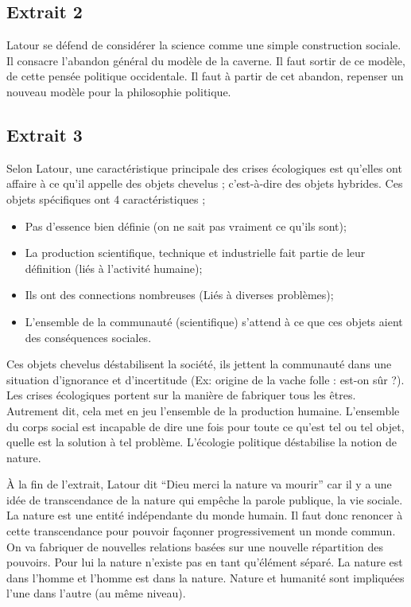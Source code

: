\subsection{Extrait 2}

Latour se défend de considérer la science comme une simple construction sociale.
Il consacre l'abandon général du modèle de la caverne.
Il faut sortir de ce modèle, de cette pensée politique occidentale.
Il faut à partir de cet abandon, repenser un nouveau modèle pour la philosophie politique.

\subsection{Extrait 3}

Selon Latour, une caractéristique principale des crises écologiques est qu'elles ont affaire à ce qu'il appelle des objets chevelus ; c'est-à-dire des objets hybrides.
Ces objets spécifiques ont 4 caractéristiques ;
\begin{itemize}
	\item Pas d'essence bien définie (on ne sait pas vraiment ce qu'ils sont);
	\item La production scientifique, technique et industrielle fait partie de leur définition (liés à l'activité humaine);
	\item Ils ont des connections nombreuses (Liés à diverses problèmes);
	\item L'ensemble de la communauté (scientifique) s'attend à ce que ces objets aient des conséquences sociales.
\end{itemize}
Ces objets chevelus déstabilisent la société, ils jettent la communauté dans une situation d'ignorance et d'incertitude (Ex: origine de la vache folle : est-on sûr ?).
Les crises écologiques portent sur la manière de fabriquer tous les êtres.
Autrement dit, cela met en jeu l'ensemble de la production humaine.
L'ensemble du corps social est incapable de dire une fois pour toute ce qu'est tel ou tel objet, quelle est la solution à tel problème.
L'écologie politique déstabilise la notion de nature.

À la fin de l'extrait, Latour dit  ``Dieu merci la nature va mourir'' car il y a une idée de transcendance de la nature qui empêche la parole publique, la vie sociale.
La nature est une entité indépendante du monde humain.
Il faut donc renoncer à cette transcendance pour pouvoir façonner progressivement un monde commun.
On va fabriquer de nouvelles relations basées sur une nouvelle répartition des pouvoirs.
Pour lui la nature n'existe pas en tant qu'élément séparé.
La nature est dans l'homme et l'homme est dans la nature.
Nature et humanité sont impliquées l'une dans l'autre (au même niveau).

